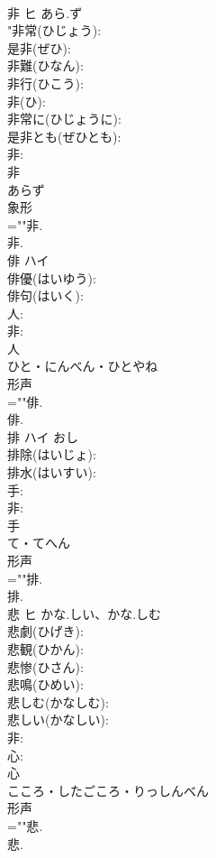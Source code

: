 \documentclass[8pt]{extreport}
\begin{document}
\begin{CJK}{UTF8}{min}
\\	非	ヒ	あら.ず		
\\	"非常(ひじょう): 
\\	是非(ぜひ): 
\\	非難(ひなん): 
\\	非行(ひこう): 
\\	非(ひ): 
\\	非常に(ひじょうに): 
\\	是非とも(ぜひとも): 
\\	非: 
\\	非	
\\	あらず	
\\	象形 
\\	=""非.
\\	非.
\\	俳	ハイ			
\\	俳優(はいゆう): 
\\	俳句(はいく): 
\\	人: 
\\	非: 
\\	人	
\\	ひと・にんべん・ひとやね	
\\	形声 
\\	=""俳.
\\	俳.
\\	排	ハイ		おし	
\\	排除(はいじょ): 
\\	排水(はいすい): 
\\	手: 
\\	非: 
\\	手	
\\	て・てへん	
\\	形声 
\\	=""排.
\\	排.
\\	悲	ヒ	かな.しい、かな.しむ		
\\	悲劇(ひげき): 
\\	悲観(ひかん): 
\\	悲惨(ひさん): 
\\	悲鳴(ひめい): 
\\	悲しむ(かなしむ): 
\\	悲しい(かなしい): 
\\	非: 
\\	心: 
\\	心	
\\	こころ・したごころ・りっしんべん	
\\	形声 
\\	=""悲.
\\	悲.

\end{CJK}
\end{document}
